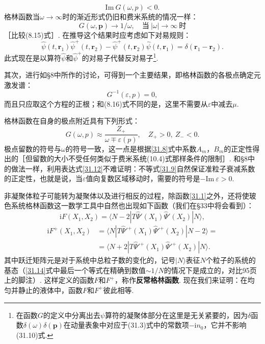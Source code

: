 \begin{equation}
\mathrm{Im}\ G(\omega,p)<0.
\label{31.9}
\end{equation}
格林函数当$\omega\to\infty$时的渐近形式仍旧和费米系统的情况一样：
\begin{equation}
G(\omega,\bm{p})\to1/\omega,\quad\text{当}\ |\omega|\to\infty\ \text{时}
\label{31.10}
\end{equation}
［比较(8.15)式］. 在推导这个结果时应考虑如下对易规则：
\begin{equation*}
\hat{\psi}(t,\bm{r}_{1})\hat{\psi}^{+}(t,\bm{r}_{2})
-\hat{\psi}^{+}(t,\bm{r}_{2})\hat{\psi}(t,\bm{r}_{1})
=\delta(\bm{r}_{1}-\bm{r}_{2}).
\end{equation*}
此式现在是以算符$\hat{\psi}$和$\hat{\psi}^{+}$的对易子代替反对易子\footnote{在函数$G$的定义中分离出去$\psi$算符的凝聚体部分在这里是无关紧要的，因为$\delta$函数$\delta(\omega)\delta(\bm{p})$在动量表象中对应于(31.3)式中的常数项$-\mathrm{i}n_{0}$，它并不影响(31.10)式.}.

其次，进行如§8中所作的讨论，可得到一个主要结果，即格林函数的各极点确定元激发谱：
\begin{equation}
G^{-1}(\varepsilon,p)=0,
\label{31.11}
\end{equation}
而且只应取这个方程的正根；和(8.16)式不同的是，这里不需要从$\varepsilon$中减去$\mu$.

格林函数在自身的极点附近具有下列形式：
\begin{equation}
G(\omega,p)\approx\frac{Z_{+}}{\omega\mp\varepsilon(p)},\quad
Z_{+}>0,\ Z_{-}<0.
\label{31.12}
\end{equation}
极点留数的符号与$\omega$的符号一致，这一点是根据\eqref{31.8}式中系数$A_{m}$，$B_{m}$的正定性得出的［但留数的大小不受任何类似于费米系统(10.4)式那样条件的限制］. 和§8中的做法一样，利用表达式\eqref{31.12}不难证明：不等式\eqref{31.9}自然保证准粒子衰减系数的正定性，也就是说，当$\varepsilon$值向复数区域移动时，需要的符号是$-\mathrm{Im}\ \varepsilon>0$.

非凝聚体粒子可能转为凝聚体以及进行相反的过程，除函数\eqref{31.1}之外，还将使玻色系统格林函数这一数学工具中自然也出现如下函数（我们在§33中将会看到）：
\begin{equation}
\mathrm{i}F(X_{1},X_{2})
=\langle N-2|T\hat{\Psi}'(X_{1})\hat{\Psi}'(X_{2})|N\rangle,
\label{31.13}
\end{equation}
\begin{equation}
\begin{aligned}
\mathrm{i}F^{+}(X_{1},X_{2})
&=\langle N|T\hat{\Psi}'^{+}(X_{1})\hat{\Psi}'^{+}(X_{2})|N-2\rangle={}\\
&=\langle N+2|T\hat{\Psi}'^{+}(X_{1})\hat{\Psi}'^{+}(X_{2})|N\rangle.
\end{aligned}
\label{31.14}
\end{equation}
其中跃迁矩阵元是对于系统中总粒子数的变化的，记号$|N\rangle$表征$N$个粒子的系统的基态（\eqref{31.14}式中最后一个等式在精确到数值$\sim1/N$的情况下是成立的，对比95页上的脚注）. 这样定义的函数$F$和$F^{+}$，称作\textbf{反常格林函数}. 现在我们来证明：在均匀并静止的液体中，函数$F$和$F^{+}$彼此相等.

